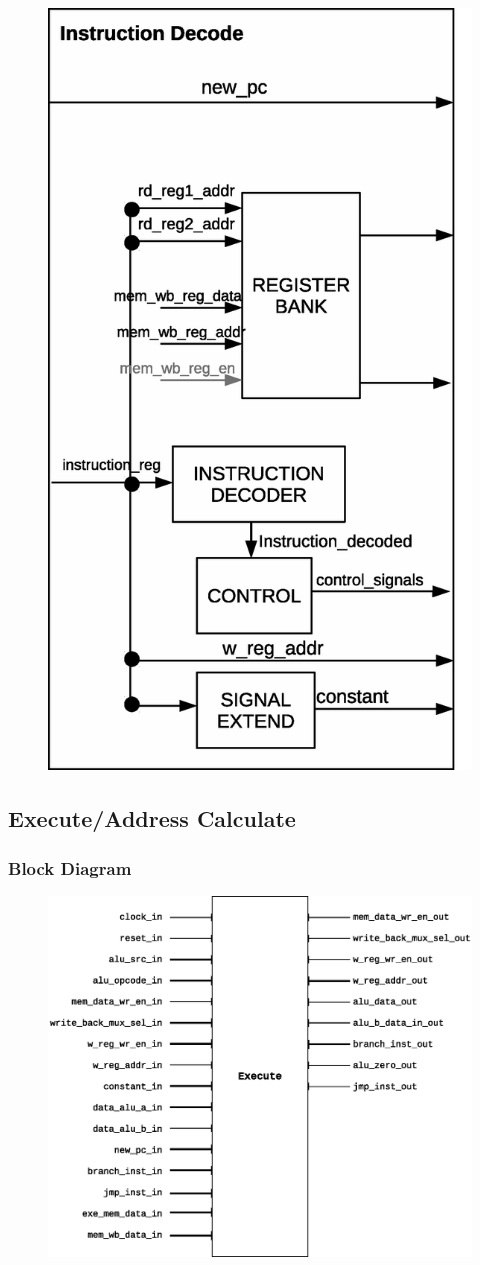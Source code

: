 \documentclass{article}
\begin{document}
  \begin{figure}[H]
    \centering
    \includegraphics[width=0.45\linewidth]{pictures/datapath/id_datapath.eps}
  \end{figure} 
  
  
  \newpage
  \subsection{Execute/Address Calculate}
  \subsubsection{Block Diagram}
  \begin{figure}[H]
    \centering
    \includegraphics[width=\linewidth]{pictures/blocks/ex_block.eps}
  \end{figure} 
\end{document}
